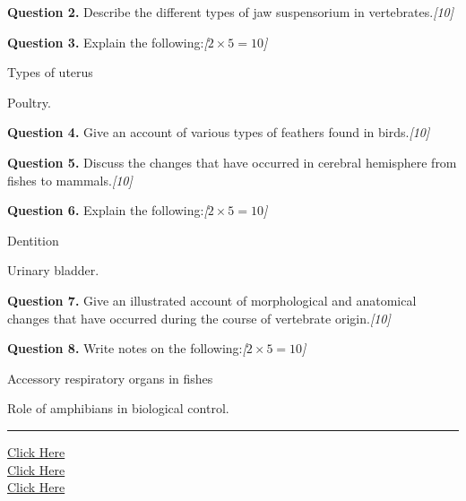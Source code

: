 \documentclass[11pt,a4paper]{article}
\newcommand{\pts}[1]{\hfill   \textit{[#1]}}
\begin{document}
\medskip


\noindent   \textbf{Question 2.} Describe the different types of jaw suspensorium in vertebrates.\pts{10}

\medskip


\noindent   \textbf{Question 3.} Explain the following:\pts{$2  \times 5 = 10$}

\begin{parts}
  \item Types of uterus
  \item Poultry.
\end{parts}

\medskip


\noindent   \textbf{Question 4.} Give an account of various types of feathers found in birds.\pts{10}

\medskip


\noindent   \textbf{Question 5.} Discuss the changes that have occurred in cerebral hemisphere from fishes to mammals.\pts{10}

\medskip


\noindent   \textbf{Question 6.} Explain the following:\pts{$2  \times 5 = 10$}

\begin{parts}
  \item Dentition
  \item Urinary bladder.
\end{parts}

\medskip


\noindent   \textbf{Question 7.} Give an illustrated account of morphological and anatomical changes that have occurred during the course of vertebrate origin.\pts{10}

\medskip


\noindent   \textbf{Question 8.} Write notes on the following:\pts{$2  \times 5 = 10$}

\begin{parts}
  \item Accessory respiratory organs in fishes
  \item Role of amphibians in biological control.
\end{parts}

\vfill
\rule{\linewidth}{0.4pt}

\begin{center}\small
\href{https://bhu-exam.vercel.app/}{Click Here}\\[4pt]\href{https://me-aryan.vercel.app/}{Click Here}\\[4pt]\href{https://quashan-me.vercel.app/}{Click Here}
\end{center}
\end{document}
